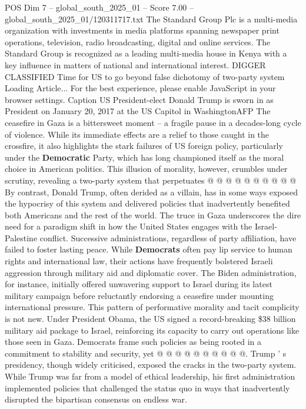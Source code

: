 \begin{textsample}{POS Dim 7 – global\_south\_2025\_01 – Score 7.00 – global\_south\_2025\_01/120311717.txt}  \label{ex:f7_pos_339}
The Standard Group Plc is a multi-media organization with investments in media platforms spanning newspaper print operations, television, radio broadcasting, digital and online services.
The Standard Group is recognized as a leading multi-media house in Kenya with a key influence in matters of national and international interest.
DIGGER CLASSIFIED Time for US to go beyond false dichotomy of two-party system Loading Article...
For the best experience, please enable JavaScript in your browser settings.
Caption US President-elect Donald Trump is sworn in as President on January 20, 2017 at the US Capitol in WashingtonAFP The ceasefire in Gaza is a bittersweet moment -- a fragile pause in a decades-long cycle of violence.
While its immediate effects are a relief to those caught in the crossfire, it also highlights the stark failures of US foreign policy, particularly under the \textbf{Democratic} Party, which has long championed itself as the moral choice in American politics.
This illusion of morality, however, crumbles under scrutiny, revealing a two-party system that perpetuates @ @ @ @ @ @ @ @ @ @ By contrast, Donald Trump, often derided as a villain, has in some ways exposed the hypocrisy of this system and delivered policies that inadvertently benefited both Americans and the rest of the world.
The truce in Gaza underscores the dire need for a paradigm shift in how the United States engages with the Israel-Palestine conflict.
Successive administrations, regardless of party affiliation, have failed to foster lasting peace.
While \textbf{Democrats} often pay lip service to human rights and international law, their actions have frequently bolstered Israeli aggression through military aid and diplomatic cover.
The Biden administration, for instance, initially offered unwavering support to Israel during its latest military campaign before reluctantly endorsing a ceasefire under mounting international pressure.
This pattern of performative morality and tacit complicity is not new.
Under President Obama, the US signed a record-breaking \$38 billion military aid package to Israel, reinforcing its capacity to carry out operations like those seen in Gaza.
Democrats frame such policies as being rooted in a commitment to stability and security, yet @ @ @ @ @ @ @ @ @ @.
Trump ' s presidency, though widely criticised, exposed the cracks in the two-party system.
While Trump was far from a model of ethical leadership, his first administration implemented policies that challenged the status quo in ways that inadvertently disrupted the bipartisan consensus on endless war.

\end{textsample}
